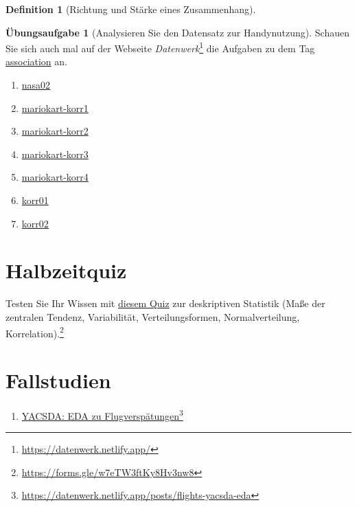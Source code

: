 \documentclass[
  a4paper,
  DIV=11]{scrreprt}
\providecommand{\tightlist}{%
  \setlength{\itemsep}{0pt}\setlength{\parskip}{0pt}}\usepackage{longtable,booktabs,array}
\theoremstyle{definition}
\newtheorem{exercise}{Übungsaufgabe}[chapter]
\theoremstyle{definition}
\theoremstyle{definition}
\newtheorem{definition}{Definition}[chapter]
\theoremstyle{remark}
\begin{document}
\begin{definition}[Richtung und Stärke eines
Zusammenhang]
\begin{exercise}[Analysieren Sie den Datensatz zur
Handynutzung]
Schauen Sie sich auch mal auf der Webseite \emph{Datenwerk}\footnote{\url{https://datenwerk.netlify.app/}}
die Aufgaben zu dem Tag
\href{https://datenwerk.netlify.app/\#category=association}{association}
an.

\begin{enumerate}
\def\labelenumi{\arabic{enumi}.}
\tightlist
\item
  \href{https://datenwerk.netlify.app/posts/nasa02/nasa02.html}{nasa02}
\item
  \href{https://datenwerk.netlify.app/posts/mariokart-korr1/mariokart-korr1.html}{mariokart-korr1}
\item
  \href{https://datenwerk.netlify.app/posts/mariokart-korr2/mariokart-korr2.html}{mariokart-korr2}
\item
  \href{https://datenwerk.netlify.app/posts/mariokart-korr3/mariokart-korr3.html}{mariokart-korr3}
\item
  \href{https://datenwerk.netlify.app/posts/mariokart-korr4/mariokart-korr4.html}{mariokart-korr4}
\item
  \href{https://datenwerk.netlify.app/posts/korr01/korr01.html}{korr01}
\item
  \href{https://datenwerk.netlify.app/posts/korr02/korr02.html}{korr02}
\end{enumerate}

\section{Halbzeitquiz}\label{halbzeitquiz}

Testen Sie Ihr Wissen mit
\href{https://forms.gle/w7eTW3ftKy8Hv3nw8}{diesem Quiz} zur deskriptiven
Statistik (Maße der zentralen Tendenz, Variabilität, Verteilungsformen,
Normalverteilung, Korrelation).\footnote{\url{https://forms.gle/w7eTW3ftKy8Hv3nw8}}

\section{Fallstudien}\label{fallstudien-1}

\begin{enumerate}
\def\labelenumi{\arabic{enumi}.}
\tightlist
\item
  \href{https://datenwerk.netlify.app/posts/flights-yacsda-eda/}{YACSDA:
  EDA zu Flugverspätungen}\footnote{\url{https://datenwerk.netlify.app/posts/flights-yacsda-eda}}
\end{enumerate}

\begin{tcolorbox}[enhanced jigsaw, leftrule=.75mm, opacitybacktitle=0.6, colback=white, colframe=quarto-callout-note-color-frame, coltitle=black, colbacktitle=quarto-callout-note-color!10!white, opacityback=0, left=2mm, breakable, titlerule=0mm, toptitle=1mm, bottomtitle=1mm, rightrule=.15mm, title=\textcolor{quarto-callout-note-color}{\faInfo}\hspace{0.5em}{Hinweis}, arc=.35mm, bottomrule=.15mm, toprule=.15mm]


\end{tcolorbox}
\end{exercise}
\end{definition}
\end{document}
